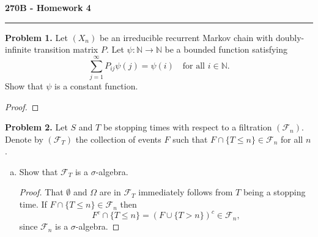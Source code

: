 \documentclass[11pt,letterpaper]{report}
\newcommand{\naturals}{\mathbb{N}}
\newcommand{\mcal}[1]{\mathcal{#1}}
\begin{document}
\begin{center}
{\bf \Large 270B - Homework 4}
\vspace{0.2cm}
\hrule
\end{center}

\noindent\textbf{Problem 1. }
Let $(X_n)$ be an irreducible recurrent Markov chain with doubly-infinite transition matrix $P$. Let $\psi: \naturals\to \naturals$ be a bounded function satisfying
\[
\sum_{j=1}^\infty P_{ij}\psi(j) = \psi(i)\quad\text{for all }i\in \naturals.
\]
Show that $\psi$ is a constant function.
\begin{proof}
	
\end{proof}

\noindent\textbf{Problem 2. }
Let $S$ and $T$ be stopping times with respect to a filtration $(\mcal{F}_n)$. Denote by $(\mcal{F}_T)$ the collection of events $F$ such that $F\cap \{T\leq n\} \in \mcal{F}_n$ for all $n$.
\begin{enumerate}[(a)]
	\item Show that $\mcal{F}_T$ is a $\sigma$-algebra.
	\begin{proof}
		That $\emptyset$ and $\Omega$ are in $\mcal{F}_T$ immediately follows from $T$ being a stopping time. If $F\cap \{T\leq n\}\in \mcal{F}_n$ then
		\[
		F^c\cap \{T\leq n\} = (F\cup \{T > n\})^c\in \mcal{F}_n,
		\]
		since $\mcal{F}_n$ is a $\sigma$-algebra.
	\end{proof}
\end{enumerate}
\end{document}

